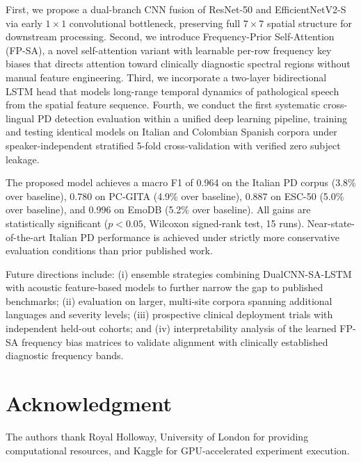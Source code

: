 \documentclass[conference]{IEEEtran}
\begin{document}
First, we propose a dual-branch CNN fusion of ResNet-50 and EfficientNetV2-S via early $1\times1$ convolutional bottleneck, preserving full $7\times7$ spatial structure for downstream processing. Second, we introduce Frequency-Prior Self-Attention (FP-SA), a novel self-attention variant with learnable per-row frequency key biases that directs attention toward clinically diagnostic spectral regions without manual feature engineering. Third, we incorporate a two-layer bidirectional LSTM head that models long-range temporal dynamics of pathological speech from the spatial feature sequence. Fourth, we conduct the first systematic cross-lingual PD detection evaluation within a unified deep learning pipeline, training and testing identical models on Italian and Colombian Spanish corpora under speaker-independent stratified 5-fold cross-validation with verified zero subject leakage.

The proposed model achieves a macro F1 of 0.964 on the Italian PD corpus (3.8\% over baseline), 0.780 on PC-GITA (4.9\% over baseline), 0.887 on ESC-50 (5.0\% over baseline), and 0.996 on EmoDB (5.2\% over baseline). All gains are statistically significant ($p < 0.05$, Wilcoxon signed-rank test, 15 runs). Near-state-of-the-art Italian PD performance is achieved under strictly more conservative evaluation conditions than prior published work.

Future directions include: (i) ensemble strategies combining DualCNN-SA-LSTM with acoustic feature-based models to further narrow the gap to published benchmarks; (ii) evaluation on larger, multi-site corpora spanning additional languages and severity levels; (iii) prospective clinical deployment trials with independent held-out cohorts; and (iv) interpretability analysis of the learned FP-SA frequency bias matrices to validate alignment with clinically established diagnostic frequency bands.

\section*{Acknowledgment}
The authors thank Royal Holloway, University of London for providing computational resources, and Kaggle for GPU-accelerated experiment execution.
\end{document}
